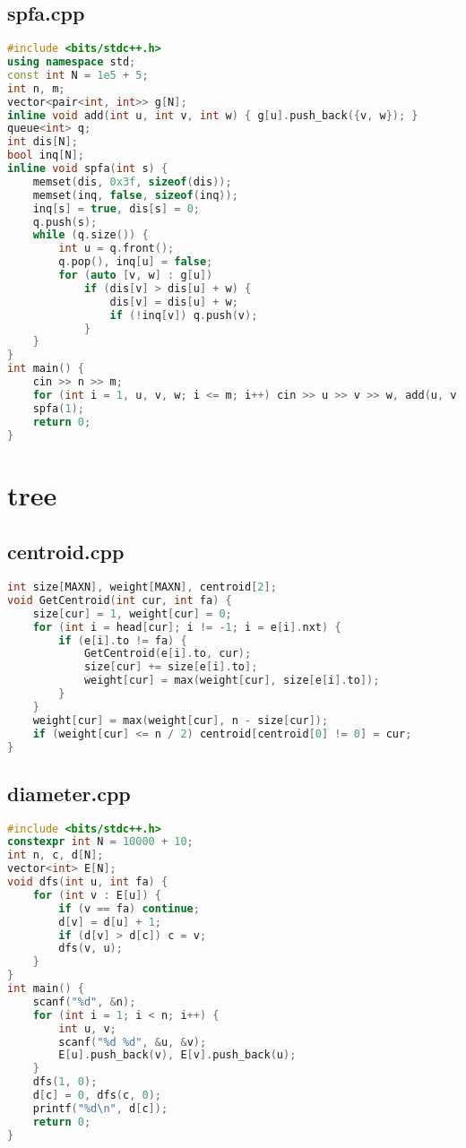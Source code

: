 \documentclass[9pt, a4paper, oneside]{book}
\begin{document}
\subsection{spfa.cpp}
\begin{lstlisting}[language={C++}]
#include <bits/stdc++.h>
using namespace std;
const int N = 1e5 + 5;
int n, m;
vector<pair<int, int>> g[N];
inline void add(int u, int v, int w) { g[u].push_back({v, w}); }
queue<int> q;
int dis[N];
bool inq[N];
inline void spfa(int s) {
    memset(dis, 0x3f, sizeof(dis));
    memset(inq, false, sizeof(inq));
    inq[s] = true, dis[s] = 0;
    q.push(s);
    while (q.size()) {
        int u = q.front();
        q.pop(), inq[u] = false;
        for (auto [v, w] : g[u])
            if (dis[v] > dis[u] + w) {
                dis[v] = dis[u] + w;
                if (!inq[v]) q.push(v);
            }
    }
}
int main() {
    cin >> n >> m;
    for (int i = 1, u, v, w; i <= m; i++) cin >> u >> v >> w, add(u, v, w), add(v, u, w);
    spfa(1);
    return 0;
}\end{lstlisting}
\section{tree}
\subsection{centroid.cpp}
\begin{lstlisting}[language={C++}]
int size[MAXN], weight[MAXN], centroid[2];
void GetCentroid(int cur, int fa) {
    size[cur] = 1, weight[cur] = 0;
    for (int i = head[cur]; i != -1; i = e[i].nxt) {
        if (e[i].to != fa) {
            GetCentroid(e[i].to, cur);
            size[cur] += size[e[i].to];
            weight[cur] = max(weight[cur], size[e[i].to]);
        }
    }
    weight[cur] = max(weight[cur], n - size[cur]);
    if (weight[cur] <= n / 2) centroid[centroid[0] != 0] = cur;
}\end{lstlisting}
\subsection{diameter.cpp}
\begin{lstlisting}[language={C++}]
#include <bits/stdc++.h>
constexpr int N = 10000 + 10;
int n, c, d[N];
vector<int> E[N];
void dfs(int u, int fa) {
    for (int v : E[u]) {
        if (v == fa) continue;
        d[v] = d[u] + 1;
        if (d[v] > d[c]) c = v;
        dfs(v, u);
    }
}
int main() {
    scanf("%d", &n);
    for (int i = 1; i < n; i++) {
        int u, v;
        scanf("%d %d", &u, &v);
        E[u].push_back(v), E[v].push_back(u);
    }
    dfs(1, 0);
    d[c] = 0, dfs(c, 0);
    printf("%d\n", d[c]);
    return 0;
}\end{lstlisting}
\end{document}
